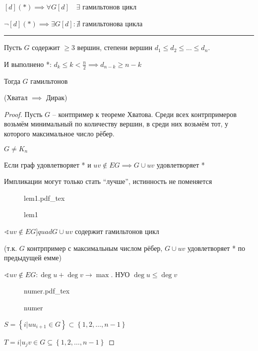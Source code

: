 \documentclass{book}
\theoremstyle{definition}
\newcommand{\incfig}[1]{%
    \def\svgwidth{\columnwidth}
    {#1.pdf_tex}
}
\begin{document}
\begin{theorem}

    $[d](*) \implies \forall G[d]\quad\exists $ гамильтонов цикл

    $\neg [d](*) \implies \exists G[d]: \nexists$ гамильтонова цикла

    \hrule

    Пусть $G$ содержит  $\geqslant 3$ вершин, степени вершин $d_1 \leqslant  d_2 \leqslant  \ldots \leqslant  d_n$.

    И выполнено *: $d_k \leqslant k<\frac{n}{2} \implies d_{n-k}\geqslant n-k$ 

    Тогда $G$ гамильтонов 

    (Хватал $\implies $ Дирак)
\end{theorem} 
\begin{proof}
    Пусть $G$ -- контпример к теореме Хватова. Среди всех контрпримеров возьмём минимальный по количеству вершин, в среди них возьмём тот, у которого максимальное число рёбер.

     $G \neq  K_n$

     \begin{lemma}
         Если граф удовлетворяет * и $uv \not\in EG \implies G\cup uv$ удовлетворяет *
         
        Импликации могут только стать ``лучше'', истинность не поменяется
     \end{lemma}
     \begin{figure}[!ht]
        \centering
        \incfig{lem1}
        \caption{lem1}
        \label{fig:lem1}
    \end{figure}
     \begin{lemma}
         $\sphericalangle uv\not\in EG]quad G\cup uv$ содержит гамильтонов цикл

         (т.к. $G$ контрпример с максимальным числом рёбер,  $G\cup uv$ удовлетворяет * по предыдущей емме)
     \end{lemma}
     $\sphericalangle uv\not\in EG: \deg u + \deg v \to \max$. НУО $\deg u \leqslant \deg v$

\begin{figure}[!ht]
    \centering
    \incfig{numer}
    \caption{numer}
    \label{fig:numer}
\end{figure}

$S = \left\{ i| uu_{i+1}\in G  \right\} \subset \left\{ 1, 2, \ldots, n-1 \right\} $

$T= {i| u_jv\in G} \subseteq \left\{ 1, 2, \ldots, n-1 \right\} $


\end{proof}
\end{document}
